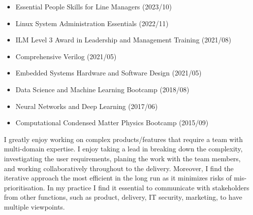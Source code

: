 \documentclass[10pt,a4paper,ragged2e,withhyper]{altacv}
\begin{document}
\begin{paracol}{2}
\begin{itemize}
    
    
    \item Essential People Skills for Line Managers (2023/10)

    \item Linux System Administration Essentials (2022/11)
    
    \item ILM Level 3 Award in Leadership and Management Training (2021/08)
    
    \item Comprehensive Verilog (2021/05)
    
    \item Embedded Systems Hardware and Software Design (2021/05)
    
    \item Data Science and Machine Learning Bootcamp (2018/08)
    
    \item Neural Networks and Deep Learning (2017/06)
    
    \item Computational Condensed Matter Physics Bootcamp (2015/09)
    
\end{itemize}




I greatly enjoy working on complex products/features that require a team with
multi-domain expertise.
I enjoy taking a lead in breaking down the complexity, investigating the user
requirements, planing the work with the team members, and working
collaboratively throughout to the delivery.
Moreover, I find the iterative approach the most efficient in the long run
as it minimizes risks of mis-prioritisation.
In my practice I find it essential to communicate with stakeholders from
other functions, such as product, delivery, IT security, marketing, to have
multiple viewpoints.


\end{paracol}
\end{document}

